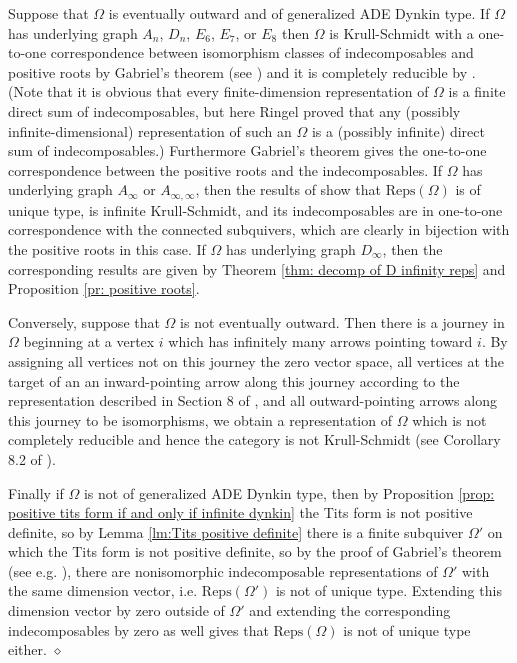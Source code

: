 \documentclass{article}
\newenvironment{proof}{\vspace*{2ex}\noindent {\em Proof:}
}{\hfill $\diamond$ \\[2ex]}
\begin{document}
\begin{proof}
Suppose that $\Omega$ is eventually outward and of generalized ADE Dynkin type. If $\Omega$ has underlying graph $A_n$, $D_n$, $E_6$, $E_7$, or $E_8$ then $\Omega$ is Krull-Schmidt  with a one-to-one correspondence between isomorphism classes of indecomposables and positive roots by Gabriel's theorem (see \cite{gabriel1972}) and it is completely reducible by \cite{ringel2016}. (Note that it is obvious that every finite-dimension representation of $\Omega$ is a finite direct sum of indecomposables, but here Ringel proved that any (possibly infinite-dimensional) representation of such an $\Omega$ is a (possibly infinite) direct sum of indecomposables.) Furthermore Gabriel's theorem gives the one-to-one correspondence between the positive roots and the indecomposables. If $\Omega$ has underlying graph $A_\infty$ or $A_{\infty, \infty}$, then the results of \cite{gallup2022decompositions} show that $\text{Reps}(\Omega)$ is of unique type, is infinite Krull-Schmidt, and its indecomposables are in one-to-one correspondence with the connected subquivers, which are clearly in bijection with the positive roots in this case. If $\Omega$ has underlying graph $D_\infty$, then the corresponding results are given by Theorem \ref{thm: decomp of D infinity reps} and Proposition \ref{pr: positive roots}. 

Conversely, suppose that $\Omega$ is not eventually outward. Then there is a journey in $\Omega$ beginning at a vertex $i$ which has infinitely many arrows pointing toward $i$. By assigning all vertices not on this journey the zero vector space, all vertices at the target of an an inward-pointing arrow along this journey according to the representation described in Section 8 of \cite{gallup2022decompositions}, and all outward-pointing arrows along this journey to be isomorphisms, we obtain a representation of $\Omega$ which is not completely reducible and hence the category is not Krull-Schmidt (see Corollary 8.2 of \cite{gallup2022decompositions}). 


Finally if $\Omega$ is not of generalized ADE Dynkin type, then by Proposition \ref{prop: positive tits form if and only if infinite dynkin} the Tits form is not positive definite, so by Lemma \ref{lm:Tits positive definite} there is a finite subquiver $\Omega'$ on which the Tits form is not positive definite, so by the proof of Gabriel's theorem (see e.g. \cite{brion2008representations}), there are nonisomorphic indecomposable representations of  $\Omega'$ with the same dimension vector, i.e. $\text{Reps}(\Omega')$ is not of unique type. Extending this dimension vector by zero outside of $\Omega'$ and extending the corresponding indecomposables by zero as well gives that $\text{Reps}(\Omega)$ is not of unique type either. 
\end{proof}
\end{document}
